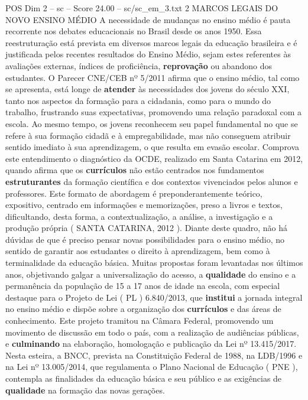 \begin{textsample}{POS Dim 2 – sc – Score 24.00 – sc/sc\_em\_3.txt}  \label{ex:f2_pos_006}
2 MARCOS LEGAIS DO NOVO ENSINO MÉDIO A necessidade de mudanças no ensino médio é pauta recorrente nos debates educacionais no Brasil desde os anos 1950.
Essa reestruturação está prevista em diversos marcos legais da educação brasileira e é justificada pelos recentes resultados do Ensino Médio, sejam estes referentes às avaliações externas, índices de proficiência, \textbf{reprovação} ou abandono dos estudantes.
O Parecer CNE/CEB nº 5/2011 afirma que o ensino médio, tal como se apresenta, está longe de \textbf{atender} às necessidades dos jovens do século XXI, tanto nos aspectos da formação para a cidadania, como para o mundo do trabalho, frustrando suas expectativas, promovendo uma relação paradoxal com a escola.
Ao mesmo tempo, os jovens reconhecem seu papel fundamental no que se refere à sua formação cidadã e à empregabilidade, mas não conseguem atribuir sentido imediato à sua aprendizagem, o que resulta em evasão escolar.
Comprova este entendimento o diagnóstico da OCDE, realizado em Santa Catarina em 2012, quando afirma que os \textbf{currículos} não estão centrados nos fundamentos \textbf{estruturantes} da formação científica e dos contextos vivenciados pelos alunos e professores.
Este formato de abordagem é preponderantemente teórico, expositivo, centrado em informações e memorizações, preso a livros e textos, dificultando, desta forma, a contextualização, a análise, a investigação e a produção própria ( SANTA CATARINA, 2012 ).
Diante deste quadro, não há dúvidas de que é preciso pensar novas possibilidades para o ensino médio, no sentido de garantir aos estudantes o direito à aprendizagem, bem como à terminalidade da educação básica.
Muitas propostas foram levantadas nos últimos anos, objetivando galgar a universalização do acesso, a \textbf{qualidade} do ensino e a permanência da população de 15 a 17 anos de idade na escola, com especial destaque para o Projeto de Lei ( PL ) 6.840/2013, que \textbf{institui} a jornada integral no ensino médio e dispõe sobre a organização dos \textbf{currículos} e das áreas de conhecimento.
Este projeto tramitou na Câmara Federal, promovendo um movimento de discussão em todo o país, com a realização de audiências públicas, e \textbf{culminando} na elaboração, homologação e publicação da Lei nº 13.415/2017.
Nesta esteira, a BNCC, prevista na Constituição Federal de 1988, na LDB/1996 e na Lei nº 13.005/2014, que regulamenta o Plano Nacional de Educação ( PNE ), contempla as finalidades da educação básica e seu público e as exigências de \textbf{qualidade} na formação das novas gerações.

\end{textsample}
